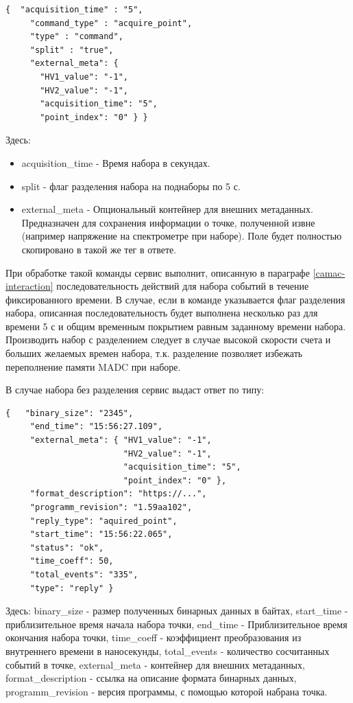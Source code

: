 \documentclass[a4paper,14pt]{extreport}
\begin{document}
\begin{lstlisting}[caption={Пример команды на набор событий.}, captionpos=b]
{  "acquisition_time" : "5",
     "command_type" : "acquire_point",
     "type" : "command",
     "split" : "true",
     "external_meta": {
       "HV1_value": "-1", 
       "HV2_value": "-1",
       "acquisition_time": "5",
       "point_index": "0" } }
\end{lstlisting}
Здесь:
\begin{itemize}
    \item acquisition\_time - Время набора в секундах.
    \item split - флаг разделения набора на поднаборы по 5 с. 
    \item external\_meta - Опциональный контейнер для внешних метаданных. Предназначен для сохранения информации о точке, полученной извне (например напряжение на спектрометре при наборе). Поле будет полностью скопировано в такой же тег в ответе.
\end{itemize}

При обработке такой команды сервис выполнит, описанную в параграфе \ref{camac-interaction} последовательность действий для набора событий в течение фиксированного времени. В случае, если в команде указывается флаг разделения набора, описанная последовательность будет выполнена несколько раз для времени 5 с и общим временным покрытием равным заданному времени набора. Производить набор с разделением следует в случае высокой скорости счета и больших желаемых времен набора, т.к. разделение позволяет избежать переполнение памяти MADC при наборе.

В случае набора без разделения сервис выдаст ответ по типу:
\begin{lstlisting}[caption={Сообщение с набранными событиями (набор без разделения).}, captionpos=b]
{   "binary_size": "2345",
     "end_time": "15:56:27.109",
     "external_meta": { "HV1_value": "-1",
                        "HV2_value": "-1",
                        "acquisition_time": "5",
                        "point_index": "0" },
     "format_description": "https://...",
     "programm_revision": "1.59aa102",
     "reply_type": "aquired_point",
     "start_time": "15:56:22.065",
     "status": "ok",
     "time_coeff": 50,
     "total_events": "335",
     "type": "reply" }
\end{lstlisting}
Здесь: binary\_size - размер полученных бинарных данных в байтах, start\_time - приблизительное время начала набора точки, end\_time - Приблизительное время окончания набора точки, time\_coeff - коэффициент преобразования из внутреннего времени в наносекунды, total\_events - количество сосчитанных событий в точке, external\_meta - контейнер для внешних метаданных, format\_description - ссылка на описание формата бинарных данных, programm\_revision - версия программы, с помощью которой набрана точка.
\end{document}
